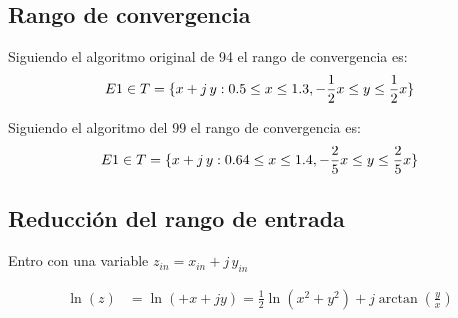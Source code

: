 \documentclass[10pt,a4paper]{book}
\begin{document}
   \subsection{Rango de convergencia}

   Siguiendo el algoritmo original de 94 el rango de convergencia es:
   \begin{equation} \label{eq:convergence_range_L_94}
      E1 \in T = \{ x + j \,y: 0.5 \leq x \leq 1.3, -\frac{1}{2}x \leq y \leq \frac{1}{2}x\}                    \\
   \end{equation}

   Siguiendo el algoritmo  del 99 el rango de convergencia es:
   \begin{equation} \label{eq:convergence_range_L_99}
      E1 \in T = \{ x + j \,y: 0.64 \leq x \leq 1.4, -\frac{2}{5}x \leq y \leq \frac{2}{5}x\}                    \\
   \end{equation}

   \subsection{Reducción del rango de entrada}

   Entro con una variable $z_{in} = x_{in} + j \, y_{in}$

   \begin{equation} \label{eq:log_z}
      \begin{aligned}
         \ln( z)        &=\ln(+x +j y)  = \frac{1}{2} \ln( x^2 + y^2) + j \arctan(\frac{y}{x})   \\
      \end{aligned}
   \end{equation}
\end{document}
